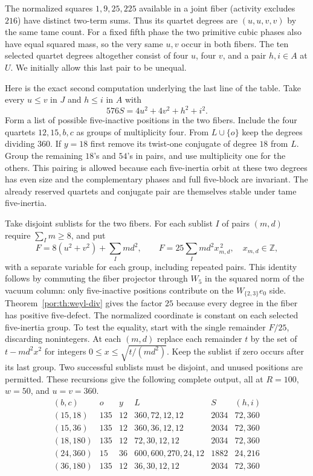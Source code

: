 \documentclass[11pt,a4paper]{article}
\numberwithin{equation}{section}
\theoremstyle{remark}
\newcommand{\ZZ}{\mathbb Z}
\begin{document}
The normalized squares $1,9,25,225$ available in a joint fiber (activity excludes $216$) have distinct two-term sums. Thus its quartet degrees are $(u,u,v,v)$ by the same tame count. For a fixed fifth phase the two primitive cubic phases also have equal squared mass, so the very same $u,v$ occur in both fibers. The ten selected quartet degrees altogether consist of four $u$, four $v$, and a pair $h,i\in A$ at $U$. We initially allow this last pair to be unequal.

Here is the exact second computation underlying the last line of the table. Take every $u\le v$ in $J$ and $h\le i$ in $A$ with
\[
              576 S=4u^2+4v^2+h^2+i^2 .
\]
Form a list of possible five-inactive positions in the two fibers. Include the four quartets $12,15,b,c$ as groups of multiplicity four. From $L\cup\{o\}$ keep the degrees dividing $360$. If $y=18$ first remove its twist-one conjugate of degree $18$ from $L$. Group the remaining $18$'s and $54$'s in pairs, and use multiplicity one for the others. This pairing is allowed because each five-inertia orbit at these two degrees has even size and the complementary phases and full five-block are invariant. The already reserved quartets and conjugate pair are themselves stable under tame five-inertia.

Take disjoint sublists for the two fibers. For each sublist $I$ of pairs $(m,d)$ require $\sum_I m\ge8$, and put
\begin{equation}\label{por:eq:two-fiber-norms}
 F=8(u^2+v^2)+\sum_I md^2,\qquad
                     F=25\sum_I md^2 x_{m,d}^{\,2},\quad x_{m,d}\in\ZZ ,
\end{equation}
with a separate variable for each group, including repeated pairs. This identity follows by commuting the fiber projector through $W_5$ in the squared norm of the vacuum column: only five-inactive positions contribute on the $W_{\{2,3\}}e_0$ side. Theorem~\ref{por:th:weyl-div} gives the factor $25$ because every degree in the fiber has positive five-defect. The normalized coordinate is constant on each selected five-inertia group. To test the equality, start with the single remainder $F/25$, discarding nonintegers. At each $(m,d)$ replace each remainder $t$ by the set of $t-md^2 x^2$ for integers $0\le x\le\sqrt{t/(md^2)}$. Keep the sublist if zero occurs after its last group. Two successful sublists must be disjoint, and unused positions are permitted. These recursions give the following complete output, all at $R=100$, $w=50$, and $u=v=360$.
\[
\begin{array}{c|c|c|l|c|c}
(b,c)&o&y&L&S&(h,i)\\\hline
(15,18)&135&12&360,72,12,12&2034&72,360\\
(15,36)&135&12&360,36,12,12&2034&72,360\\
(18,180)&135&12&72,30,12,12&2034&72,360\\
(24,360)&15&36&600,600,270,24,12&1882&24,216\\
(36,180)&135&12&36,30,12,12&2034&72,360
\end{array}
\]
\end{document}
